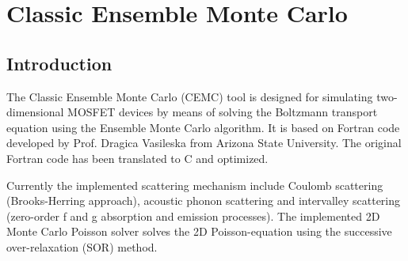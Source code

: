 
\chapter{Classic Ensemble Monte Carlo}   \label{emc}

\section{Introduction}
The Classic Ensemble Monte Carlo (CEMC) tool is designed for simulating two-dimensional MOSFET devices by means of solving the Boltzmann transport
equation using the Ensemble Monte Carlo algorithm. It is based on Fortran code developed
by Prof. Dragica Vasileska from Arizona State University. The original Fortran code has been translated to C and optimized.

Currently the implemented scattering mechanism include Coulomb scattering (Brooks-Herring approach),
acoustic phonon scattering and intervalley scattering (zero-order f and g absorption and emission processes).
The implemented 2D Monte Carlo Poisson solver solves the 2D Poisson-equation using the successive over-relaxation (SOR) method.







